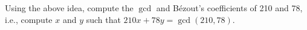   Using the above idea,
  compute the $\gcd$ and B\'ezout's coefficients of 210 and 78, i.e.,
  compute $x$ and $y$ such that $210x + 78y = \gcd(210, 78)$.
